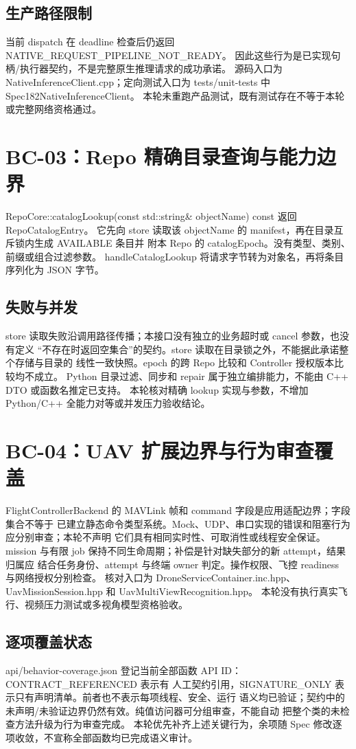 \subsection{生产路径限制}
当前 dispatch 在 deadline 检查后仍返回 NATIVE\_REQUEST\_PIPELINE\_NOT\_READY。
因此这些行为是已实现句柄/执行器契约，不是完整原生推理请求的成功承诺。
源码入口为 NativeInferenceClient.cpp；定向测试入口为 tests/unit-tests 中 Spec182NativeInferenceClient。
本轮未重跑产品测试，既有测试存在不等于本轮或完整网络资格通过。

\section{BC-03：Repo 精确目录查询与能力边界}
RepoCore::catalogLookup(const std::string\& objectName) const 返回 RepoCatalogEntry。
它先向 store 读取该 objectName 的 manifest，再在目录互斥锁内生成 AVAILABLE 条目并
附本 Repo 的 catalogEpoch。没有类型、类别、前缀或组合过滤参数。
handleCatalogLookup 将请求字节转为对象名，再将条目序列化为 JSON 字节。

\subsection{失败与并发}
store 读取失败沿调用路径传播；本接口没有独立的业务超时或 cancel 参数，也没有定义
“不存在时返回空集合”的契约。store 读取在目录锁之外，不能据此承诺整个存储与目录的
线性一致快照。epoch 的跨 Repo 比较和 Controller 授权版本比较均不成立。
Python 目录过滤、同步和 repair 属于独立编排能力，不能由 C++ DTO 或函数名推定已支持。
本轮核对精确 lookup 实现与参数，不增加 Python/C++ 全能力对等或并发压力验收结论。

\section{BC-04：UAV 扩展边界与行为审查覆盖}
FlightControllerBackend 的 MAVLink 帧和 command 字段是应用适配边界；字段集合不等于
已建立静态命令类型系统。Mock、UDP、串口实现的错误和阻塞行为应分别审查；本轮不声明
它们具有相同实时性、可取消性或线程安全保证。
mission 与有限 job 保持不同生命周期；补偿是针对缺失部分的新 attempt，结果归属应
结合任务身份、attempt 与终端 owner 判定。操作权限、飞控 readiness 与网络授权分别检查。
核对入口为 DroneServiceContainer.inc.hpp、UavMissionSession.hpp 和 UavMultiViewRecognition.hpp。
本轮没有执行真实飞行、视频压力测试或多视角模型资格验收。

\subsection{逐项覆盖状态}
api/behavior-coverage.json 登记当前全部函数 API ID：CONTRACT\_REFERENCED 表示有
人工契约引用，SIGNATURE\_ONLY 表示只有声明清单。前者也不表示每项线程、安全、运行
语义均已验证；契约中的未声明/未验证边界仍然有效。纯值访问器可分组审查，不能自动
把整个类的未检查方法升级为行为审查完成。
本轮优先补齐上述关键行为，余项随 Spec 修改逐项收敛，不宣称全部函数均已完成语义审计。
